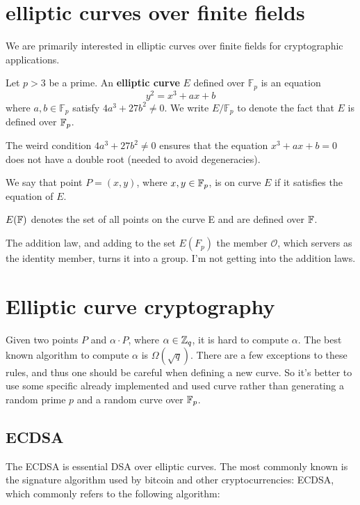 \section{elliptic curves over finite fields}
We are primarily interested in elliptic curves over finite fields for cryptographic applications.
\begin{definition}
  Let $p >3 $ be a prime. An \textbf{elliptic curve} $E$ defined over $\mathbb{F}_p$ is an 
  equation  
  $$ y^2 = x^3 +ax + b$$
  where $a,b \in \mathbb{F}_p$ satisfy $4a^3 +27b^2 \neq 0$. We write $E/\mathbb{F}_p$ to denote
  the fact that $E$ is defined over $\mathbb{F}_p$.
\end{definition}
The weird condition $4a^3 +27b^2 \neq 0 $ ensures that the equation 
$ x^3 + ax + b = 0$ does not have a double root (needed to avoid degeneracies).

\begin{definition}
  We say that point $P=(x,y)$, where $x,y \in \mathbb{F}_p$, is on curve $E$ if it satisfies the equation of $E$.
\end{definition}
\begin{definition}
  $E(\mathbb{F})$ denotes the set of all points on the curve E and are defined over $\mathbb{F}$.
\end{definition}

The addition law, and adding to the set $E(F_p)$ the member $\mathcal{O}$,
 which servers as the identity member, turns it into a group. I'm not getting into the addition laws.

\section{Elliptic curve cryptography}


Given two points $P$ and $\alpha \cdot P$, where $\alpha \in \mathbb{Z}_q$, it is hard to compute $\alpha$.
The best known algorithm to compute $\alpha$ is $\Omega(\sqrt{q})$.
There are a few exceptions to these rules, and thus one should be careful when defining a new curve.
So it's better to use some specific already implemented and used curve rather than 
generating a random prime $p$ and a random curve over $\mathbb{F}_p$.

\subsection{ECDSA}
The ECDSA is essential DSA over elliptic curves.
The most commonly known is the signature algorithm used by bitcoin and other cryptocurrencies:
ECDSA, which commonly refers to the following algorithm:

